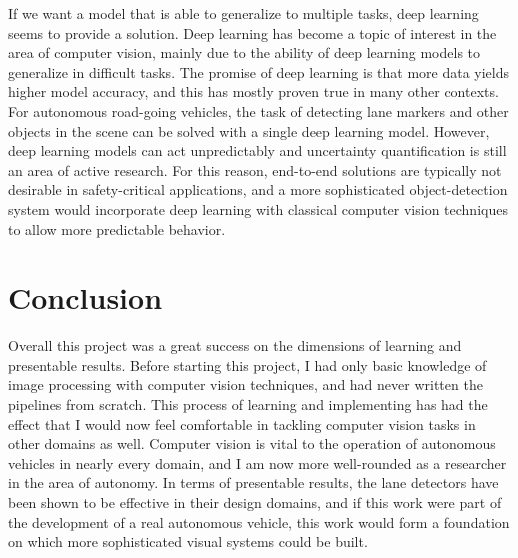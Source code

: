 \documentclass[conf]{new-aiaa}
\begin{document}
If we want a model that is able to generalize to multiple tasks, deep learning seems to provide a solution.  Deep learning has become a topic of interest in the area of computer vision, mainly due to the ability of deep learning models to generalize in difficult tasks.  The promise of deep learning is that more data yields higher model accuracy, and this has mostly proven true in many other contexts.  For autonomous road-going vehicles, the task of detecting lane markers and other objects in the scene can be solved with a single deep learning model.  However, deep learning models can act unpredictably and uncertainty quantification is still an area of active research.  For this reason, end-to-end solutions are typically not desirable in safety-critical applications, and a more sophisticated object-detection system would incorporate deep learning with classical computer vision techniques to allow more predictable behavior.

\section{Conclusion}
\label{section: conclusion}

Overall this project was a great success on the dimensions of learning and presentable results.  Before starting this project, I had only basic knowledge of image processing with computer vision techniques, and had never written the pipelines from scratch.  This process of learning and implementing has had the effect that I would now feel comfortable in tackling computer vision tasks in other domains as well. Computer vision is vital to the operation of autonomous vehicles in nearly every domain, and I am now more well-rounded as a researcher in the area of autonomy. In terms of presentable results, the lane detectors have been shown to be effective in their design domains, and if this work were part of the development of a real autonomous vehicle, this work would form a foundation on which more sophisticated visual systems could be built.
\end{document}
